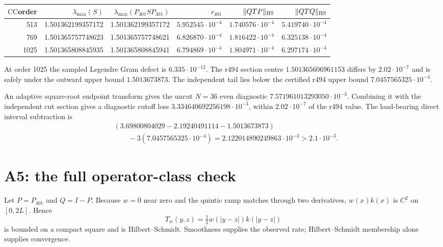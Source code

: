 \documentclass[11pt]{article}
\theoremstyle{remark}
\newcommand{\CC}{\ensuremath{\mathrm{CC}}}
\begin{document}
\begin{center}
\small
\begin{tabular}{@{}rrrrrr@{}}
\toprule
\CC order&$\lambda_{\max}(S)$&$\lambda_{\max}(P_{401}SP_{401})$
&$r_{401}$&$\|QTP\|_{\rm HS}$&$\|QTQ\|_{\rm HS}$\\
\midrule
513&1.501362199357172&1.501362199357172
&$5.952545\cdot10^{-4}$&$1.740576\cdot10^{-4}$&$5.419740\cdot10^{-4}$\\
769&1.501365757748623&1.501365757748621
&$6.826870\cdot10^{-4}$&$1.816422\cdot10^{-4}$&$6.325138\cdot10^{-4}$\\
1025&1.501365808845935&1.501365808845941
&$6.794869\cdot10^{-4}$&$1.804971\cdot10^{-4}$&$6.297174\cdot10^{-4}$\\
\bottomrule
\end{tabular}
\end{center}
At order 1025 the sampled Legendre Gram defect is
$6.335\cdot10^{-12}$.  The r494 section centre
$1.501365606961153$ differs by $2.02\cdot10^{-7}$ and is safely under
the outward upper bound $1.5013673873$.  The independent tail lies
below the certified r494 upper bound
$7.0457565325\cdot10^{-4}$.

An adaptive square-root endpoint transform gives the uncut
$N=36$ even diagnostic
$7.571961013293050\cdot10^{-3}$.  Combining it with the independent
cut section gives a diagnostic cutoff loss
$3.334640692256198\cdot10^{-3}$, within
$2.02\cdot10^{-7}$ of the r494 value.  The load-bearing direct
interval subtraction is
\[
 \begin{split}
 &(3.69800804029-2.19240491114-1.5013673873)\\
 &\qquad{}-3(7.0457565325\cdot10^{-4})
 =2.122014890249863\cdot10^{-3}>2.1\cdot10^{-3}.
 \end{split}
\]

\section{A5: the full operator-class check}

Let $P=P_{401}$ and $Q=I-P$.  Because $w=0$ near zero and the quintic
ramp matches through two derivatives, $w(x)k(x)$ is $C^2$ on
$[0,2L]$.  Hence
\[
 T_w(y,z)=\tfrac12w(|y-z|)k(|y-z|)
\]
is bounded on a compact square and is Hilbert--Schmidt.  Smoothness
supplies the observed rate; Hilbert--Schmidt membership alone supplies
convergence.
\end{document}
